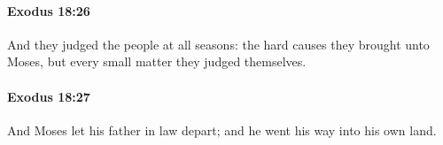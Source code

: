 		\paragraph{Exodus 18:26} %
			\label{EXODUS-18-26}

			And they judged the people at all seasons: the hard causes they brought unto Moses, but every small matter they judged themselves.


		\paragraph{Exodus 18:27} %
			\label{EXODUS-18-27}

			And Moses let his father in law depart; and he went his way into his own land.

